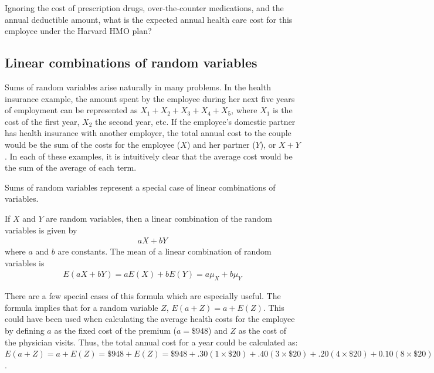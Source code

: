 \begin{example} {Ignoring the cost of prescription drugs, over-the-counter medications, and the annual deductible amount, what is the expected annual health care cost for this employee under the Harvard HMO plan?}
\end{example}


\subsection{Linear combinations of random variables}

Sums of random variables arise naturally in many problems. In the health insurance example, the amount spent by the employee during her next five years of employment can be represented as $X_1 + X_2 + X_3 + X_4 + X_5$, where $X_1$ is the cost of the first year, $X_2$ the second year, etc. If the employee's domestic partner has health insurance with another employer, the total annual cost to the couple would be the sum of the costs for the employee ($X$) and her partner ($Y$), or $X + Y$. In each of these examples, it is intuitively clear that the average cost would be the sum of the average of each term.

Sums of random variables represent a special case of linear combinations of variables.  

\begin{termBox}{
If $X$ and $Y$ are random variables, then a linear combination of the random variables is given by
\begin{align}\label{linComboOfRandomVariablesXAndY}
aX + bY
\end{align}
where $a$ and $b$ are constants.  The mean of a linear combination of random variables is 
\begin{align*}
 E(aX + bY) = aE(X) + bE(Y) = a\mu_X + b\mu_Y
\end{align*}}
\end{termBox}

There are a few special cases of this formula which are especially useful. The formula implies that for a random variable $Z$, $E(a + Z) = a + E(Z)$.  This could have been used when calculating the average health costs for the employee by defining $a$ as the fixed cost of the premium ($a=\$948$) and $Z$ as the cost of the physician visits. Thus, the total annual cost for a year could be calculated as: $E(a + Z) = a + E(Z) = \$948 + E(Z) = \$948 + .30(1 \times \$20) + .40(3 \times \$20) + .20(4 \times \$20) + 0.10(8 \times \$20)= \$1,010.00$. 

